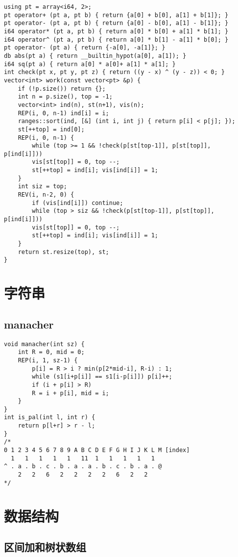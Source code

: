 \documentclass[a4paper,landscape,twocolumn]{ctexart}
\begin{document}
\begin{lstlisting}
using pt = array<i64, 2>;
pt operator+ (pt a, pt b) { return {a[0] + b[0], a[1] + b[1]}; }
pt operator- (pt a, pt b) { return {a[0] - b[0], a[1] - b[1]}; }
i64 operator* (pt a, pt b) { return a[0] * b[0] + a[1] * b[1]; }
i64 operator^ (pt a, pt b) { return a[0] * b[1] - a[1] * b[0]; }
pt operator- (pt a) { return {-a[0], -a[1]}; }
db abs(pt a) { return __builtin_hypot(a[0], a[1]); }
i64 sq(pt a) { return a[0] * a[0]+ a[1] * a[1]; }
int check(pt x, pt y, pt z) { return ((y - x) ^ (y - z)) < 0; }
vector<int> work(const vector<pt> &p) {
	if (!p.size()) return {};
	int n = p.size(), top = -1;
	vector<int> ind(n), st(n+1), vis(n);
	REP(i, 0, n-1) ind[i] = i;
	ranges::sort(ind, [&] (int i, int j) { return p[i] < p[j]; });
	st[++top] = ind[0];
	REP(i, 0, n-1) {
		while (top >= 1 && !check(p[st[top-1]], p[st[top]], p[ind[i]]))
		vis[st[top]] = 0, top --;
		st[++top] = ind[i]; vis[ind[i]] = 1;
	}
	int siz = top;
	REV(i, n-2, 0) {
		if (vis[ind[i]]) continue;
		while (top > siz && !check(p[st[top-1]], p[st[top]], p[ind[i]]))
		vis[st[top]] = 0, top --;
		st[++top] = ind[i]; vis[ind[i]] = 1;
	}
	return st.resize(top), st;
}
\end{lstlisting}

\section{字符串}

\subsection{manacher}

\begin{lstlisting}
void manacher(int sz) {
	int R = 0, mid = 0;
	REP(i, 1, sz-1) {
		p[i] = R > i ? min(p[2*mid-i], R-i) : 1;
		while (s1[i+p[i]] == s1[i-p[i]]) p[i]++;
		if (i + p[i] > R)
		R = i + p[i], mid = i;
	}
}
int is_pal(int l, int r) {
	return p[l+r] > r - l;
}
/*
0 1 2 3 4 5 6 7 8 9 A B C D E F G H I J K L M [index]
  1   1   1   1   1   11  1   1   1   1   1
^ . a . b . c . b . a . a . b . c . b . a . @
    2   2   6   2   2   2   2   6   2   2
*/
\end{lstlisting}

\section{数据结构}

\subsection{区间加和树状数组}
\end{document}
